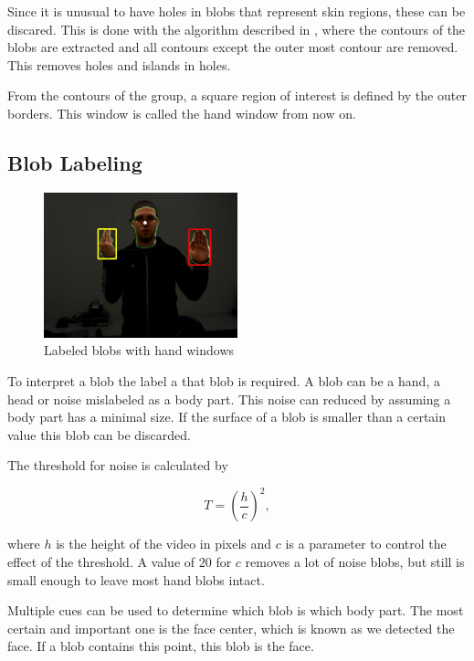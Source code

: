 Since it is unusual to have holes in blobs that represent skin regions, these can be discared. This is done with the algorithm described in \citep{Suzuki1985}, where the contours of the blobs are extracted and all contours except the outer most contour are removed. This removes holes and islands in holes.

From the contours of the group, a square region of interest is defined by the outer borders. This window is called the hand window from now on.

\subsection*{Blob Labeling}

\begin{figure}[tb]
    \center{}
    \includegraphics[width=0.5\textwidth]{figures/pipeline/contours.jpg}
	\caption{Labeled blobs with hand windows}
	\label{fig:contours}
\end{figure}

To interpret a blob the label a that blob is required. A blob can be a hand, a head or noise mislabeled as a body part. This noise can reduced by assuming a body part has a minimal size. If the surface of a blob is smaller than a certain value this blob can be discarded.

The threshold for noise is calculated by

\begin{equation}
T = (\frac{h}{c})^2,
\end{equation}

where $h$ is the height of the video in pixels and $c$ is a parameter to control the effect of the threshold. A value of $20$ for $c$ removes a lot of noise blobs, but still is small enough to leave most hand blobs intact.

Multiple cues can be used to determine which blob is which body part. The most  certain and important one is the face center, which is known as we detected the face. If a blob contains this point, this blob is the face. 

